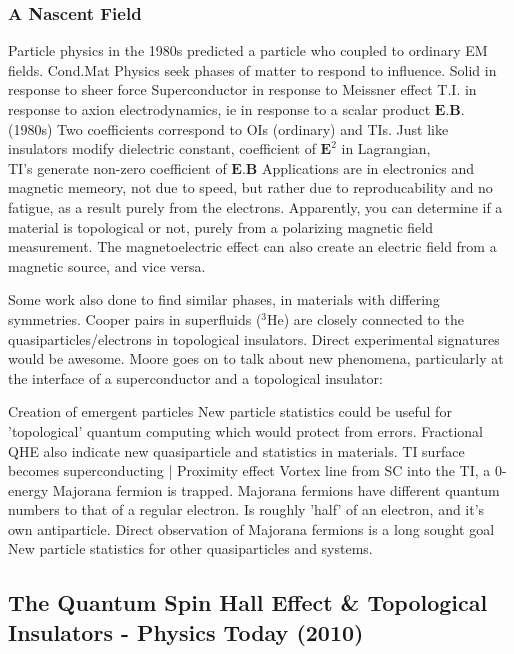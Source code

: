 \documentclass[../mattg_ti-fii_lit-review.tex]{subfiles}
\begin{document}
	\subsubsection{A Nascent Field}
	\begin{outline}
		\1 Particle physics in the 1980s predicted a particle who coupled to ordinary EM fields.
		\1 Cond.Mat Physics seek phases of matter to respond to influence. 
		\2 Solid in response to sheer force
		\2 Superconductor in response to Meissner effect
		\2 T.I. in response to axion electrodynamics, ie in response to a scalar product $\textbf{E}.\textbf{B}$. (1980s)
		\3 Two coefficients correspond to OIs (ordinary) and TIs.
		\1 Just like insulators modify dielectric constant, coefficient of $\textbf{E}^2$ in Lagrangian, \\TI's generate non-zero coefficient of $\textbf{E.B}$
		\1 Applications are in electronics and magnetic memeory, not due to speed, but rather due to reproducability and no fatigue, as a result purely from the electrons.
		\1 Apparently, you can determine if a material is topological or not, purely from a polarizing magnetic field measurement.
		\1 The magnetoelectric effect can also create an electric field from a magnetic source, and vice versa. 
		
		\1 Some work also done to find similar phases, in materials with differing symmetries. Cooper pairs in superfluids ($^3$He) are closely connected to the quasiparticles/electrons in topological insulators. Direct experimental signatures would be awesome.
		\1 Moore goes on to talk about new phenomena, particularly at the interface of a superconductor and a topological insulator:
		
		\2 Creation of emergent particles
		\2 New particle statistics could be useful for 'topological' quantum computing which would protect from errors.
		\2 Fractional QHE also indicate new quasiparticle and statistics in materials.
		\2 TI surface becomes superconducting | Proximity effect
		\3 Vortex line from SC into the TI, a 0-energy Majorana fermion is trapped.
		\3 Majorana fermions have different quantum numbers to that of a regular electron.
		\3 Is roughly 'half' of an electron,  and it's own antiparticle.
		\2 Direct observation of Majorana fermions is a long sought goal
		\2 New particle statistics for other quasiparticles and systems. 
	\end{outline} 
	
	\subsection{The Quantum Spin Hall Effect \& Topological Insulators \cite{qi_quantum_2010} - Physics Today (2010)}
\end{document}

